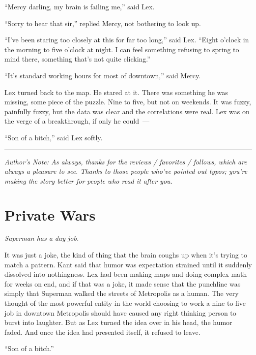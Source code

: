 \documentclass[ebook,12pt]{memoir}
\begin{document}
``Mercy darling, my brain is failing me,'' said Lex.

``Sorry to hear that sir,'' replied Mercy, not bothering to look up.

``I've been staring too closely at this for far too long,'' said Lex.
``Eight o'clock in the morning to five o'clock at night. I can feel
something refusing to spring to mind there, something that's not quite
clicking.''

``It's standard working hours for most of downtown,'' said Mercy.

Lex turned back to the map. He stared at it. There was something he was
missing, some piece of the puzzle. Nine to five, but not on weekends. It
was fuzzy, painfully fuzzy, but the data was clear and the correlations
were real. Lex was on the verge of a breakthrough, if only he could~---

``Son of a bitch,'' said Lex softly.

\begin{center}\rule{0.5\linewidth}{\linethickness}\end{center}

\emph{Author's Note: As always, thanks for the reviews / favorites /
follows, which are always a pleasure to see. Thanks to those people
who've pointed out typos; you're making the story better for people who
read it after you.}
\chapter{Private Wars}\label{private-wars}

\emph{Superman has a day job.}

It was just a joke, the kind of thing that the brain coughs up when it's
trying to match a pattern. Kant said that humor was expectation strained
until it suddenly dissolved into nothingness. Lex had been making maps
and doing complex math for weeks on end, and if that was a joke, it made
sense that the punchline was simply that Superman walked the streets of
Metropolis as a human. The very thought of the most powerful entity in
the world choosing to work a nine to five job in downtown Metropolis
should have caused any right thinking person to burst into laughter. But
as Lex turned the idea over in his head, the humor faded. And once the
idea had presented itself, it refused to leave.

``Son of a bitch.''
\end{document}
